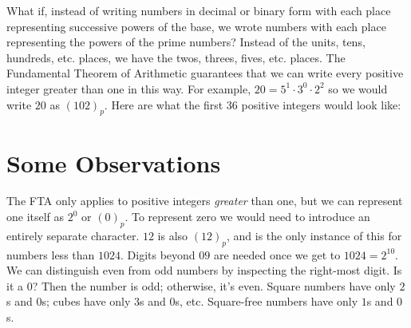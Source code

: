\documentclass[12pt]{article}
\newcommand{\ppn}[1]{(#1)_p}
\begin{document}
\noindent What if, instead of writing numbers in decimal or binary form with each place representing successive powers of the base, we wrote numbers with each place representing the powers of the prime numbers? Instead of the units, tens, hundreds, etc. places, we have the twos, threes, fives, etc. places. The Fundamental Theorem of Arithmetic guarantees that we can write every positive integer greater than one in this way. For example, $20 = 5^1 \cdot 3^0 \cdot 2^2$ so we would write $20$ as $\ppn{102}$. Here are what the first 36 positive integers would look like:

\ttfamily \small
{}
\normalfont \normalsize

\section*{Some Observations}
The FTA only applies to positive integers \textit{greater} than one, but we can represent one itself as $2^0$ or $\ppn{0}$. To represent zero we would need to introduce an entirely separate character. $12$ is also $\ppn{12}$, and is the only instance of this for numbers less than $1024$. Digits beyond $0$\textendash$9$ are needed once we get to $1024 = 2^{10}$. We can distinguish even from odd numbers by inspecting the right-most digit. Is it a $0$? Then the number is odd; otherwise, it's even. Square numbers have only $2$s and $0$s; cubes have only $3$s and $0$s, etc. Square-free numbers have only $1$s and $0$s.
\end{document}
